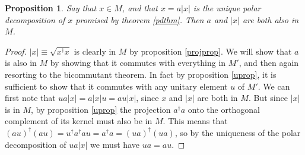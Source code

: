 \documentclass[12pt]{article}
\newtheorem{prop}{Proposition}[section]
\begin{document}
\begin{prop}
Say that $x\in M$, and that $x=a|x|$ is the unique polar decomposition of $x$ promised by theorem \eqref{pdthm}.  Then $a$ and $|x|$ are both also in $M$.
\end{prop}
\begin{proof}
$|x|\equiv \sqrt{x^\dagger x}$ is clearly in $M$ by proposition \eqref{projprop}.  We will show that $a$ is also in $M$ by showing that it commutes with everything in $M'$, and then again resorting to the bicommutant theorem.  In fact by proposition \eqref{uprop}, it is sufficient to show that it commutes with any unitary element $u$ of $M'$.  We can first note that $ua|x|=a|x|u=au|x|$, since $x$ and $|x|$ are both in $M$.  But since $|x|$ is in $M$, by proposition \eqref{uprop} the projection $a^\dagger a$ onto the orthogonal complement of its kernel must also be in $M$.  This means that $(au)^\dagger(au)=u^\dagger a^\dagger a u=a^\dagger a=(ua)^\dagger (ua)$, so by the uniqueness of the polar decomposition of $ua|x|$ we must have $ua=au$.
\end{proof}
\end{document}
